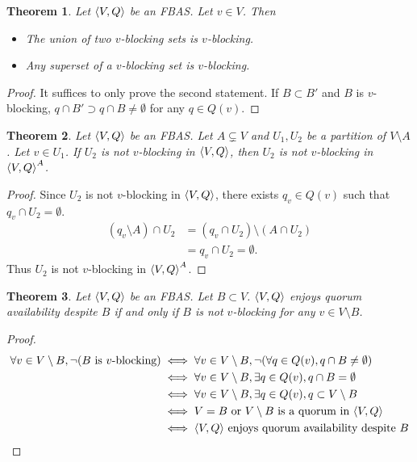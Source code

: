 \documentclass[12pt, psamsfonts]{amsart}
\newtheorem{thm}{Theorem}[section]
\theoremstyle{definition}
\theoremstyle{remark}
\numberwithin{equation}{section}
\begin{document}
\begin{thm}\label{basic_prop_v_blocking}
    Let $\ev{V, Q}$ be an FBAS\@.
    Let $v \in V$.
    Then
    \begin{itemize}
        \item
            The union of two $v$-blocking sets is $v$-blocking.
        \item
            Any superset of a $v$-blocking set is $v$-blocking.
    \end{itemize}
\end{thm}

\begin{proof}
    It suffices to only prove the second statement.
    If $B \subset B'$ and $B$ is $v$-blocking, $q \cap B' \supset q \cap B \ne \emptyset$ for any $q \in Q(v)$.
\end{proof}

\begin{thm}\label{v_blocking_delete}
    Let $\ev{V, Q}$ be an FBAS\@.
    Let $A \subsetneq V$ and $U_1, U_2$ be a partition of $V \setminus A$.
    Let $v \in U_1$.
    If $U_2$ is not $v$-blocking in $\ev{V, Q}$, then $U_2$ is not $v$-blocking in $\ev{V, Q}^A$.
\end{thm}

\begin{proof}
    Since $U_2$ is not $v$-blocking in $\ev{V, Q}$, there exists $q_v \in Q(v)$ such that $q_v \cap U_2 = \emptyset$.
    \begin{align*}
        (q_v \setminus A) \cap U_2
            &= (q_v \cap U_2) \setminus (A \cap U_2) \\
            &= q_v \cap U_2 = \emptyset.
    \end{align*}
    Thus $U_2$ is not $v$-blocking in $\ev{V, Q}^A$.
\end{proof}

\begin{thm}\label{quorum_availability_v_blocking}
    Let $\ev{V, Q}$ be an FBAS\@.
    Let $B \subset V$.
    $\ev{V, Q}$ enjoys quorum availability despite $B$ if and only if $B$ is not $v$-blocking for any $v \in V \setminus B$.
\end{thm}

\begin{proof}
    \begin{align*}
        \forall v \in V \setminus B, \neg(\text{$B$ is $v$-blocking})
            &\iff \forall v \in V \setminus B, \neg(\forall q \in Q(v), q \cap B \ne \emptyset) \\
            &\iff \forall v \in V \setminus B, \exists q \in Q(v), q \cap B = \emptyset \\
            &\iff \forall v \in V \setminus B, \exists q \in Q(v), q \subset V \setminus B \\
            &\iff \text{$V = B$ or $V \setminus B$ is a quorum in $\ev{V, Q}$} \\
            &\iff \text{$\ev{V, Q}$ enjoys quorum availability despite $B$}
    \end{align*}
\end{proof}
\end{document}
